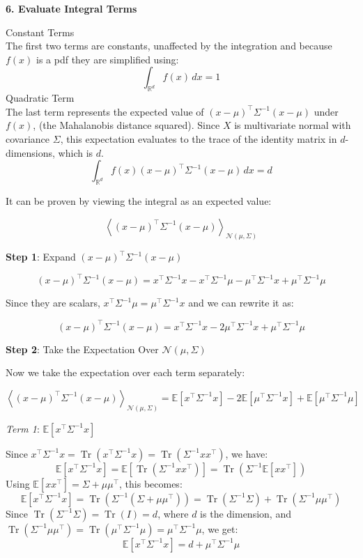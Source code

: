 \documentclass{article}
\begin{document}
\textbf{6. \textbf{Evaluate Integral Terms}}

Constant Terms\\
The first two terms are constants, unaffected by the integration and because $f(x)$ is a pdf they are simplified using: 
\[
 \int_{\mathbb{R}^d} f(x)  \, dx = 1
\]
Quadratic Term \\
The last term represents the expected value of \( (x - \mu)^\top \Sigma^{-1} (x - \mu) \) under \( f(x) \), (the Mahalanobis distance squared). Since \( X \) is multivariate normal with covariance \( \Sigma \), this expectation evaluates to the trace of the identity matrix in \( d \)-dimensions, which is \( d \).
\[
\int_{\mathbb{R}^d} f(x) (x - \mu)^\top \Sigma^{-1} (x - \mu) \, dx = d
\]

It can be proven by viewing the integral as an expected value: 

\[
\left< (x - \mu)^\top \Sigma^{-1} (x - \mu) \right>_{\mathcal{N}(\mu, \Sigma)}
\]


\textbf{Step 1}: Expand \((x - \mu)^\top \Sigma^{-1} (x - \mu)\)

\[
(x - \mu)^\top \Sigma^{-1} (x - \mu) = x^\top \Sigma^{-1} x - x^\top \Sigma^{-1} \mu - \mu^\top \Sigma^{-1} x + \mu^\top \Sigma^{-1} \mu
\]

Since they are scalars, \(x^\top \Sigma^{-1} \mu = \mu^\top \Sigma^{-1} x\) and we can rewrite it as:

\[
(x - \mu)^\top \Sigma^{-1} (x - \mu) = x^\top \Sigma^{-1} x - 2 \mu^\top \Sigma^{-1} x + \mu^\top \Sigma^{-1} \mu
\]

\textbf{Step 2}: Take the Expectation Over \( \mathcal{N}(\mu, \Sigma) \)

Now we take the expectation over each term separately:

\[
\left< (x - \mu)^\top \Sigma^{-1} (x - \mu) \right>_{\mathcal{N}(\mu, \Sigma)} = \mathbb{E} \left[ x^\top \Sigma^{-1} x \right] - 2 \mathbb{E} \left[ \mu^\top \Sigma^{-1} x \right] + \mathbb{E} \left[ \mu^\top \Sigma^{-1} \mu \right]
\]

\textit{Term 1}: \( \mathbb{E} \left[ x^\top \Sigma^{-1} x \right] \)

Since \( x^\top \Sigma^{-1} x = \operatorname{Tr}(x^\top \Sigma^{-1} x) = \operatorname{Tr}(\Sigma^{-1} x x^\top) \), we have:
\[
\mathbb{E} \left[ x^\top \Sigma^{-1} x \right] = \mathbb{E} \left[ \operatorname{Tr}(\Sigma^{-1} x x^\top) \right] = \operatorname{Tr}(\Sigma^{-1} \mathbb{E}[x x^\top])
\]
Using \( \mathbb{E}[x x^\top] = \Sigma + \mu \mu^\top \), this becomes:
\[
\mathbb{E} \left[ x^\top \Sigma^{-1} x \right] = \operatorname{Tr}(\Sigma^{-1} (\Sigma + \mu \mu^\top)) = \operatorname{Tr}(\Sigma^{-1} \Sigma) + \operatorname{Tr}(\Sigma^{-1} \mu \mu^\top)
\]
Since \( \operatorname{Tr}(\Sigma^{-1} \Sigma) = \operatorname{Tr}(I) = d \), where \(d\) is the dimension, and \( \operatorname{Tr}(\Sigma^{-1} \mu \mu^\top) =  \operatorname{Tr}(\mu^\top \Sigma^{-1} \mu )=  \mu^\top \Sigma^{-1} \mu \), we get:
\[
\mathbb{E} \left[ x^\top \Sigma^{-1} x \right] = d + \mu^\top \Sigma^{-1} \mu
\]
\end{document}

